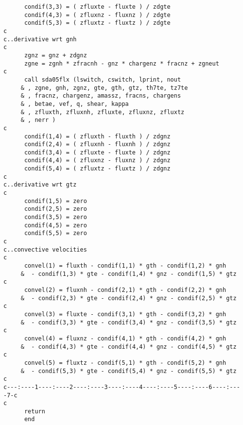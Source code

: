 \begin{verbatim}
      condif(3,3) = ( zfluxte - fluxte ) / zdgte
      condif(4,3) = ( zfluxnz - fluxnz ) / zdgte
      condif(5,3) = ( zfluxtz - fluxtz ) / zdgte
c
c..derivative wrt gnh
c
      zgnz = gnz + zdgnz
      zgne = zgnh * zfracnh - gnz * chargenz * fracnz + zgneut
c
      call sda05flx (lswitch, cswitch, lprint, nout
     & , zgne, gnh, zgnz, gte, gth, gtz, th7te, tz7te
     & , fracnz, chargenz, amassz, fracns, chargens
     & , betae, vef, q, shear, kappa
     & , zfluxth, zfluxnh, zfluxte, zfluxnz, zfluxtz
     & , nerr )
c
      condif(1,4) = ( zfluxth - fluxth ) / zdgnz
      condif(2,4) = ( zfluxnh - fluxnh ) / zdgnz
      condif(3,4) = ( zfluxte - fluxte ) / zdgnz
      condif(4,4) = ( zfluxnz - fluxnz ) / zdgnz
      condif(5,4) = ( zfluxtz - fluxtz ) / zdgnz
c
c..derivative wrt gtz
c
      condif(1,5) = zero
      condif(2,5) = zero
      condif(3,5) = zero
      condif(4,5) = zero
      condif(5,5) = zero
c
c..convective velocities
c
      convel(1) = fluxth - condif(1,1) * gth - condif(1,2) * gnh
     &  - condif(1,3) * gte - condif(1,4) * gnz - condif(1,5) * gtz
c
      convel(2) = fluxnh - condif(2,1) * gth - condif(2,2) * gnh
     &  - condif(2,3) * gte - condif(2,4) * gnz - condif(2,5) * gtz
c
      convel(3) = fluxte - condif(3,1) * gth - condif(3,2) * gnh
     &  - condif(3,3) * gte - condif(3,4) * gnz - condif(3,5) * gtz
c
      convel(4) = fluxnz - condif(4,1) * gth - condif(4,2) * gnh
     &  - condif(4,3) * gte - condif(4,4) * gnz - condif(4,5) * gtz
c
      convel(5) = fluxtz - condif(5,1) * gth - condif(5,2) * gnh
     &  - condif(5,3) * gte - condif(5,4) * gnz - condif(5,5) * gtz
c
c---:----1----:----2----:----3----:----4----:----5----:----6----:----7-c
c
      return
      end
\end{verbatim}

